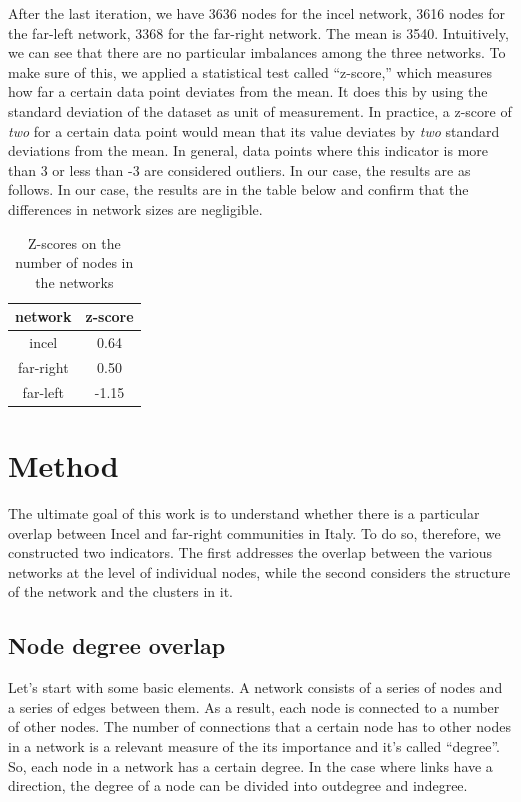 \documentclass[a4paper,twoside,12pt, openany]{book}
\begin{document}
After the last iteration, we have 3636 nodes for the incel network, 3616 nodes for the far-left network, 3368 for the far-right network. The mean is 3540. Intuitively, we can see that there are no particular imbalances among the three networks. To make sure of this, we applied a statistical test called “z-score,” which measures how far a certain data point deviates from the mean. It does this by using the standard deviation of the dataset as unit of measurement. In practice, a z-score of \emph{two} for a certain data point would mean that its value deviates by \emph{two} standard deviations from the mean. In general, data points where this indicator is more than 3 or less than -3 are considered outliers. In our case, the results are as follows. In our case, the results are in the table below and confirm that the differences in network sizes are negligible. \\

\renewcommand{\arraystretch}{1.5}
\setlength{\tabcolsep}{2em}
\begin{table}[h!]
	\centering
	\begin{tabular}{| c | c |}
		\hline
		\textbf{network} & \textbf{z-score} \\
		\hline
		incel & 0.64 \\
		\hline
		far-right & 0.50 \\
		\hline
		far-left & -1.15 \\
		\hline
	\end{tabular}
	\caption{Z-scores on the number of nodes in the networks}
\end{table}

\setlength{\tabcolsep}{6pt}

\chapter{Method}
The ultimate goal of this work is to understand whether there is a particular overlap between Incel and far-right communities in Italy. To do so, therefore, we constructed two indicators. The first addresses the overlap between the various networks at the level of individual nodes, while the second considers the structure of the network and the clusters in it.

\section{Node degree overlap}
\label{ch:node_overlap}
Let's start with some basic elements. A network consists of a series of nodes and a series of edges between them. As a result, each node is connected to a number of other nodes.  The number of connections that a certain node has to other nodes in a network is a relevant measure of the its importance and it's called “degree”. So, each node in a network has a certain degree. In the case where links have a direction, the degree of a node can be divided into outdegree and indegree.\\
\end{document}

